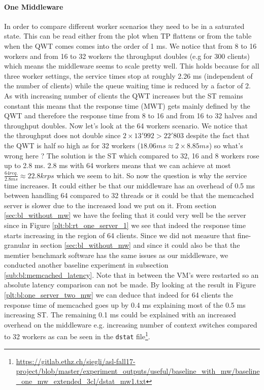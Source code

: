 \documentclass[11pt,a4paper]{article}
\let\tt\texttt
\begin{document}
\paragraph{One Middleware} In order to compare different worker scenarios they need to be in a saturated state. This can be read either from the plot when TP flattens or from the table when the QWT comes comes into the order of 1 ms. We notice that from 8 to 16 workers and from 16 to 32 workers the throughput doubles (e.g for 300 clients) which means the middleware seems to scale pretty well. This holds because for all three worker settings, the service times stop at roughly 2.26 ms (independent of the number of clients) while the queue waiting time is reduced by a factor of 2. As with increasing number of clients the QWT increases but the ST remains constant this means that the response time (MWT) gets mainly defined by the QWT and therefore the response time from 8 to 16 and from 16 to 32 halves and throughput doubles. Now let's look at the 64 workers scenario. We notice that the throughput does not double since $2\times 13'992 > 22'803$ despite the fact that the QWT is half so high as for 32 workers ($18.06ms \approx 2 \times 8.85ms$) so what's wrong here ? The solution is the ST which compared to 32, 16 and 8 workers rose up to 2.8 ms. 2.8 ms with 64 workers means that we can achieve at most $\frac{64req.}{2.8 ms} \approx 22.8k rps$ which we seem to hit. So now the question is why the service time increases. It could either be that our middleware has an overhead of 0.5 ms between handling 64 compared to 32 threads or it could be that the memcached server is slower due to the increased load we put on it. From section \ref{sec:bl_without_mw} we have the feeling that it could very well be the server since in Figure \ref{plt:bl:rt_one_server_1} we see that indeed the response time starts increasing in the region of 64 clients. Since we did not measure that fine-granular in section \ref{sec:bl_without_mw} and since it could also be that the memtier benchmark software has the same issues as our middleware, we conducted another baseline experiment in subsection \ref{sub:bl:memcached_latency}. Note that in between the VM's were restarted so an absolute latency comparison can not be made. By looking at the result in Figure \ref{plt:bl:one_server_two_mw} we can deduce that indeed for 64 clients the response time of memcached goes up by 0.4 ms explaining most of the 0.5 ms increasing ST. The remaining 0.1 ms could be explained with an increased overhead on the middleware e.g. increasing number of context switches compared to 32 workers as can be seen in the \tt{dstat} file\footnote{\url{https://gitlab.ethz.ch/siegli/asl-fall17-project/blob/master/experiment_outputs/useful/baseline_with_mw/baseline_one_mw_extended_3cl/dstat_mw1.txt}}. 
\end{document}
